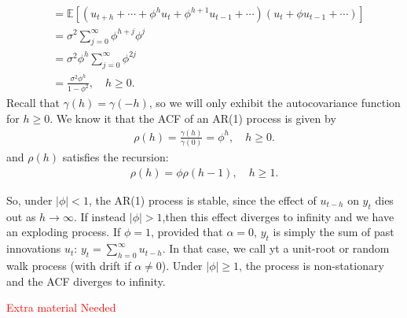 \begin{eg}[AR(1) Process]
\begin{align*}
        &= \mathbb{E}\left[ \left(u_{t+h} + \cdots + \phi^h u_t + \phi^{h+1} u_{t-1} + \cdots \right) \left( u_t + \phi u_{t-1} + \cdots \right) \right]\\
        &= \sigma^2 \sum_{j=0}^{\infty} \phi^{h+j} \phi^j \\
        &= \sigma^2 \phi^h \sum_{j=0}^{\infty} \phi^{2j} \\
        &= \frac{\sigma^2 \phi^h}{1-\phi^2}, \quad h \geq 0.
    \end{align*}
    Recall that $\gamma(h) = \gamma(-h)$, so we will only exhibit the autocovariance function for $h \geq 0.$
    We know it that the ACF of an AR(1) process is given by
    \begin{gather*}
        \rho(h) = \frac{\gamma(h)}{\gamma(0)} = \phi^h, \quad h \geq 0.
    \end{gather*}
    and $\rho(h)$ satisfies the recursion:
    \begin{gather*}
        \rho(h) = \phi \rho(h-1), \quad h \geq 1.
    \end{gather*}
\end{eg}

So, under $\vert \phi \vert < 1$, the AR(1) process is stable, since the effect of $u_{t-h}$ on $y_t$ dies out as $h \to \infty.$
If instead $\vert \phi \vert > 1$,then this effect diverges to infinity and we have an exploding process.
If $\phi = 1$, provided that $\alpha = 0$, $y_t$ is simply the sum of past innovations $u_t$:
$y_t = \sum_{h=0}^{\infty} u_{t-h}$. In that case, we call yt a unit-root or random walk process (with drift if $\alpha \neq 0$).
Under $\vert \phi \vert \geq 1$, the process is non-stationary and the ACF diverges to infinity.

\textcolor{red}{Extra material Needed}

